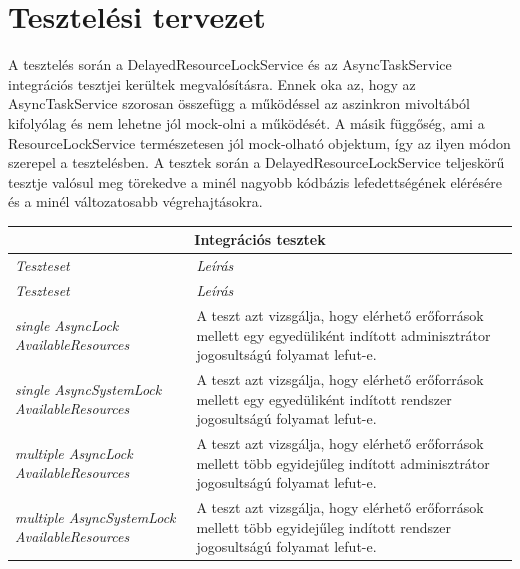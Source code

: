 \section{Tesztelési tervezet}

A tesztelés során a DelayedResourceLockService és az AsyncTaskService integrációs tesztjei kerültek megvalósításra. Ennek oka az, hogy az AsyncTaskService szorosan összefügg a működéssel az aszinkron mivoltából kifolyólag és nem lehetne jól mock-olni a működését. A másik függőség, ami a ResourceLockService természetesen jól mock-olható objektum, így az ilyen módon szerepel a tesztelésben. A tesztek során a DelayedResourceLockService teljeskörű tesztje valósul meg törekedve a minél nagyobb kódbázis lefedettségének elérésére és a minél változatosabb végrehajtásokra.

\begin{center}
	\begin{longtable}{ | p{} | p{} | }
		
		\hline
		\multicolumn{2}{|c|}{\textbf{Integrációs tesztek}}
		\\ \hline
		
		\emph{Teszteset} & \emph{Leírás}
		\\ \hline \hline
		\endfirsthead %
		
		\hline
		\emph{Teszteset} & \emph{Leírás}
		\\ \hline \hline
		\endhead %
		
		\hline
		\endfoot %
		
		\endlastfoot %
		
        \emph{single AsyncLock AvailableResources} &
        A teszt azt vizsgálja, hogy elérhető erőforrások mellett egy egyedüliként indított adminisztrátor jogosultságú folyamat lefut-e.
		\\ \hline
		
		\emph{single AsyncSystemLock AvailableResources} &
		A teszt azt vizsgálja, hogy elérhető erőforrások mellett egy egyedüliként indított rendszer jogosultságú folyamat lefut-e.
		\\ \hline
		
		\emph{multiple AsyncLock AvailableResources} &
		A teszt azt vizsgálja, hogy elérhető erőforrások mellett több egyidejűleg indított adminisztrátor jogosultságú folyamat lefut-e.
		\\ \hline
		
		\emph{multiple AsyncSystemLock AvailableResources} &
		A teszt azt vizsgálja, hogy elérhető erőforrások mellett több egyidejűleg indított rendszer jogosultságú folyamat lefut-e.
		\\ \hline
		

\end{longtable}
\end{center}
